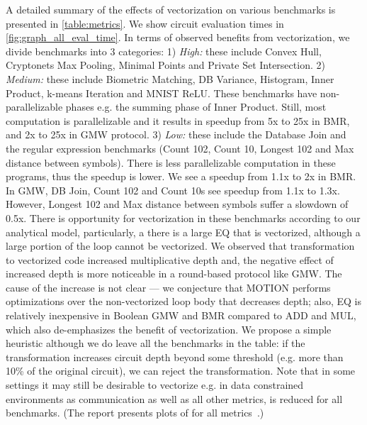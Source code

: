 \begin{figure*}[htbp]
\centering
\resizebox{0.7\textwidth}{!}{}
\caption{Circuit Evaluation Time (Setup + Online) of Benchmarks}
\label{fig:graph_all_eval_time}
\end{figure*}

A detailed summary of the effects of vectorization on various benchmarks is presented in \cref{table:metrics}. We show circuit evaluation times in \cref{fig:graph_all_eval_time}. In terms of observed benefits from vectorization, we divide benchmarks into 3 categories: 1) {\it High:} these include Convex Hull, Cryptonets Max Pooling, Minimal Points and Private Set Intersection. 
2) {\it Medium:} these include Biometric Matching, DB Variance, Histogram, Inner Product, k-means Iteration and MNIST ReLU. These benchmarks have non-parallelizable phases e.g. the summing phase of Inner Product. Still, most computation is parallelizable and it results in speedup from 5x to 25x in BMR, and 2x to 25x in GMW protocol. 3) {\it Low:} these include the Database Join and the regular expression benchmarks (Count 102, Count 10, Longest 102 and Max distance between symbols). There is less parallelizable computation in these programs, thus the speedup is lower. We see a speedup from 1.1x to 2x in BMR. In GMW, DB Join, Count 102 and Count 10s see speedup from 1.1x to 1.3x. However, Longest 102 and Max distance between symbols suffer a slowdown of 0.5x. There is opportunity for vectorization in these benchmarks according to our analytical model, particularly, a there is a large EQ that is vectorized, although a large portion of the loop cannot be vectorized. We observed that transformation to vectorized code increased multiplicative depth and, the negative effect of increased depth is more noticeable in a round-based protocol like GMW. The cause of the increase is not clear --- we conjecture that MOTION performs optimizations over the non-vectorized loop body that decreases depth; also, EQ is relatively inexpensive in Boolean GMW and BMR compared to ADD and MUL, which also de-emphasizes the benefit of vectorization. We propose a simple heuristic although we do leave all the benchmarks in the table: if the transformation increases circuit depth beyond some threshold (e.g. more than 10\% of the original circuit), we can reject the transformation. %
Note that in some settings it may still be desirable to vectorize e.g. in data constrained environments as communication as well as all other metrics, is reduced for all benchmarks. (The report presents plots of for all metrics~\cite{Anon_TR}.)%

